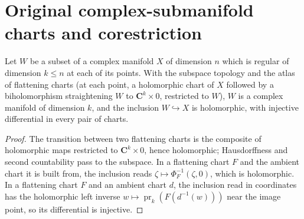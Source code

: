 \section{Original complex-submanifold charts and corestriction}

\begin{lemma}
\label{ana:submanifold-complex-structure}
\mixedleanok
Let \(W\) be a subset of a complex manifold \(X\) of dimension \(n\) which is regular of
dimension \(k\le n\) at each of its points. With the subspace topology and the atlas of
flattening charts (at each point, a holomorphic chart of \(X\) followed by a biholomorphism
straightening \(W\) to \(\mathbf C^k\times0\), restricted to \(W\)), \(W\) is a complex manifold
of dimension \(k\), and the inclusion \(W\hookrightarrow X\) is holomorphic, with injective
differential in every pair of charts.
\end{lemma}
\begin{proof}
\mixedleanok
The transition between two flattening charts is the composite of holomorphic maps restricted
to \(\mathbf C^k\times0\), hence holomorphic; Hausdorffness and second countability pass to
the subspace. In a flattening chart \(F\) and the ambient chart it is built from, the inclusion
reads \(\zeta\mapsto\Phi_F^{-1}(\zeta,0)\), which is holomorphic. In a flattening chart \(F\) and an
ambient chart \(d\), the inclusion read in coordinates has the holomorphic left inverse \(w\mapsto\operatorname{pr}_k(F(d^{-1}(w)))\)
near the image point, so its differential is injective.
\end{proof}

